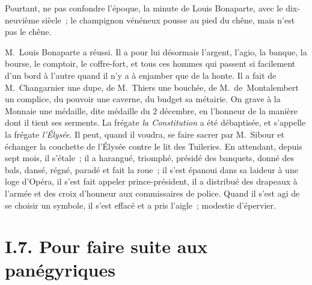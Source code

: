 \documentclass[french,twoside]{book} %
\begin{document}
Pourtant, ne pas confondre l’époque, la minute de Louis Bonaparte, avec le dix-neuvième siècle ; le champignon vénéneux pousse au pied du chêne, mais n’est pas le chêne.\par
M. Louis Bonaparte a réussi. Il a pour lui désormais l’argent, l’agio, la banque, la bourse, le comptoir, le coffre-fort, et tous ces hommes qui passent si facilement d’un bord à l’autre quand il n’y a à enjamber que de la honte. Il a fait de M. Changarnier une dupe, de M. Thiers une bouchée, de M. de Montalembert un complice, du pouvoir une caverne, du budget sa métairie. On grave à la Monnaie une médaille, dite médaille du 2 décembre, en l’honneur de la manière dont il tient ses serments. La frégate \emph{la Constitution} a été débaptisée, et s’appelle la frégate \emph{l’Élysée}. Il peut, quand il voudra, se faire sacrer par M. Sibour et échanger la couchette de l’Élysée contre le lit des Tuileries. En attendant, depuis sept mois, il s’étale ; il a harangué, triomphé, présidé des banquets, donné des bals, dansé, régné, paradé et fait la roue ; il s’est épanoui dans sa laideur à une loge d’Opéra, il s’est fait appeler prince-président, il a distribué des drapeaux à l’armée et des croix d’honneur aux commissaires de police. Quand il s’est agi de se choisir un symbole, il s’est effacé et a pris l’aigle ; modestie d’épervier.

\section[{I.7. Pour faire suite aux panégyriques}]{I.7. Pour faire suite aux panégyriques}
\end{document}

